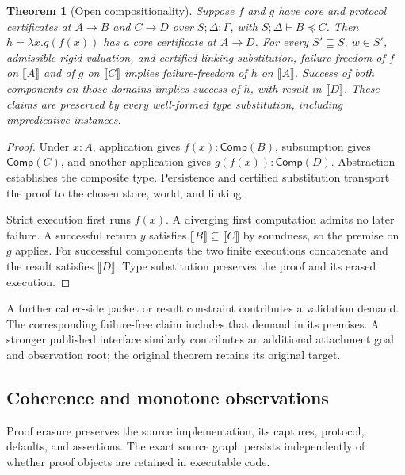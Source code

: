 \documentclass[10pt,a4paper]{article}
\newcommand{\sem}[1]{\llbracket #1\rrbracket}
\newcommand{\Comp}{\mathsf{Comp}}
\newtheorem{theorem}[definition]{Theorem}
\theoremstyle{remark}
\begin{document}
\begin{theorem}[Open compositionality]\label{thm:composition}
Suppose $f$ and $g$ have core and protocol certificates at $A\to B$ and
$C\to D$ over $S;\Delta;\Gamma$, with $S;\Delta\vdash B\preceq C$.
Then $h=\lambda x.g(f(x))$ has a core certificate at $A\to D$.
For every $S'\sqsubseteq S$, $w\in S'$, admissible rigid valuation, and certified
linking substitution, failure-freedom of $f$ on $\sem A$ and of $g$ on
$\sem C$ implies failure-freedom of $h$ on $\sem A$. Success of both components
on those domains implies success of $h$, with result in $\sem D$.
These claims are preserved by every well-formed type substitution, including
impredicative instances.
\end{theorem}
\begin{proof}
Under $x:A$, application gives $f(x):\Comp(B)$, subsumption gives
$\Comp(C)$, and another application gives $g(f(x)):\Comp(D)$.
Abstraction establishes the composite type. Persistence and certified
substitution transport the proof to the chosen store, world, and linking.

Strict execution first runs $f(x)$. A diverging first computation admits no
later failure. A successful return $y$ satisfies $\sem B\subseteq\sem C$
by soundness, so the premise on $g$ applies. For successful components the two
finite executions concatenate and the result satisfies $\sem D$. Type
substitution preserves the proof and its erased execution.
\end{proof}

A further caller-side packet or result constraint contributes a validation
demand. The corresponding failure-free claim includes that demand in its
premises. A stronger published interface similarly contributes an additional
attachment goal and observation root; the original theorem retains its original
target.

\subsection{Coherence and monotone observations}
Proof erasure preserves the source implementation, its captures, protocol,
defaults, and assertions. The exact source graph persists independently of
whether proof objects are retained in executable code.
\end{document}
